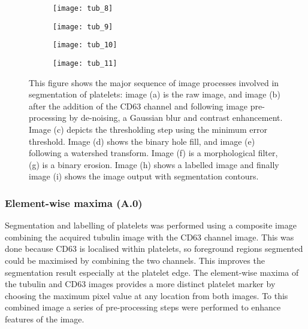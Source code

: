 \begin{figure}[htbp]
	\begin{subfigure}[b]{0.32\linewidth}
		\centering
		\texttt{[image: tub\_8]}
		\caption{}
		\label{figure:image_processing:platelet:tub_8}
		\vspace{1ex}
	\end{subfigure}
	\begin{subfigure}[b]{0.32\linewidth}
		\centering
		\texttt{[image: tub\_9]}
		\caption{}
		\label{figure:image_processing:platelet:tub_9}
		\vspace{1ex}
	\end{subfigure}
	\begin{subfigure}[b]{0.32\linewidth}
		\centering
		\texttt{[image: tub\_10]}
		\caption{}
		\label{figure:image_processing:platelet:tub_10}
		\vspace{1ex}
	\end{subfigure}
	\begin{subfigure}[b]{0.32\linewidth}
		\texttt{[image: tub\_11]}
		\caption{}
		\label{figure:image_processing:platelet:tub_11}
		\vspace{1ex}
	\end{subfigure}
\caption[Image processing for platelet segmentation]{This figure shows the  major sequence of image processes involved in segmentation of platelets: image (a) is the raw image, and image (b) after the addition of the CD63 channel and following image pre-processing by de-noising, a Gaussian blur and contrast enhancement. Image (c) depicts the thresholding step using the minimum error threshold. Image (d) shows the binary hole fill, and image (e) following a watershed transform. Image (f) is a morphological filter, (g) is a binary erosion. Image (h) shows a labelled image and finally image (i) shows the image output with segmentation contours.}
\label{figure:image_processing:platelets}
\end{figure}

\subsubsection{Element-wise maxima (A.0)}
Segmentation and labelling of platelets was performed using a composite image combining the acquired tubulin image with the CD63 channel image. This was done because CD63 is localised within platelets, so foreground regions segmented could be maximised by combining the two channels. This improves the segmentation result especially at the platelet edge. The element-wise maxima of the tubulin and CD63 images provides a more distinct platelet marker by choosing the maximum pixel value at any location from both images. To this combined image a series of pre-processing steps were performed to enhance features of the image.

